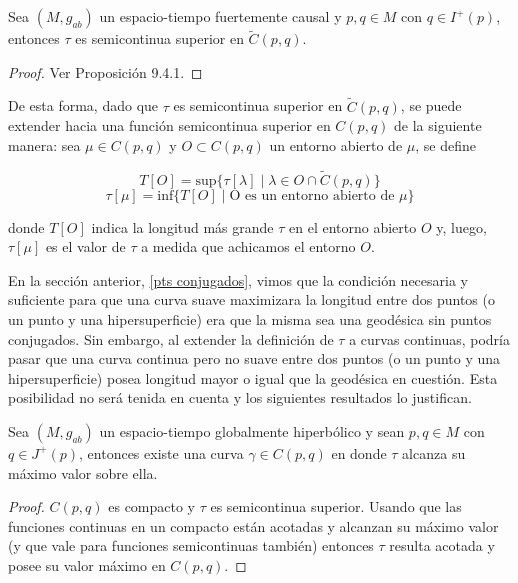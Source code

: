 \begin{proposition}
Sea $(M,g_{ab})$ un espacio-tiempo fuertemente causal y $p,q\in M$ con $q\in I^+(p)$, entonces $\tau$ es semicontinua superior en $\widetilde{C}(p,q)$.
\end{proposition}
\begin{proof}
Ver \citep{1984ucp..book.....W} Proposición 9.4.1.
\end{proof}




De esta forma, dado que $\tau$ es semicontinua superior en $\widetilde{C}(p,q)$, se puede extender hacia una función semicontinua superior en $C(p,q)$ de la siguiente manera: sea $\mu\in C(p,q)$ y $O\subset C(p,q)$ un entorno abierto de $\mu$, se define

$$
T[O]=\text{sup}\{\tau[\lambda] \mid \lambda\in O\cap \widetilde{C}(p,q)\}
$$
$$
\tau[\mu]=\text{inf}\{T[O] \mid  \text{O es un entorno abierto de $\mu$}\}
$$


donde $T[O]$ indica la longitud más grande $\tau$ en el entorno abierto $O$ y, luego, $\tau[\mu]$ es el valor de $\tau$ a medida que achicamos el entorno $O$.

En la sección anterior, \ref{pts conjugados}, vimos que la condición necesaria y suficiente para que una curva suave maximizara la longitud entre dos puntos (o un punto y una hipersuperficie) era que la misma sea una geodésica sin puntos conjugados. Sin embargo, al extender la definición de $\tau$ a curvas continuas, podría pasar que una curva continua pero no suave entre dos puntos (o un punto y una hipersuperficie) posea longitud mayor o igual que la geodésica en cuestión. Esta posibilidad no será tenida en cuenta y los siguientes resultados lo justifican.




\begin{theorem}
Sea $(M,g_{ab})$ un espacio-tiempo globalmente hiperbólico y sean $p,q\in M$ con $q\in J^+(p)$, entonces existe una curva $\gamma\in C(p,q)$ en donde $\tau$ alcanza su máximo valor sobre ella.
\end{theorem}
\begin{proof}
$C(p,q)$ es compacto y $\tau$ es semicontinua superior. Usando que las funciones continuas en un compacto están acotadas y alcanzan su máximo valor (y que vale para funciones semicontinuas también) entonces $\tau$ resulta acotada y posee su valor máximo en $C(p,q)$.
\end{proof}



